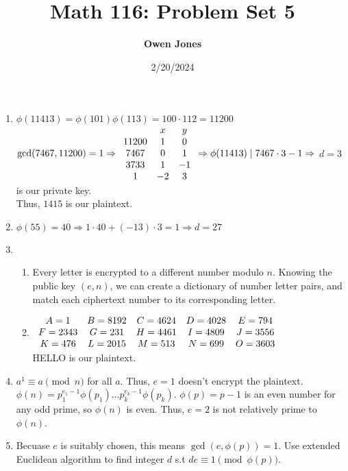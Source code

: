 \documentclass[10pt]{article}
\title{\bf Math 116: Problem Set 5}
\date{2/20/2024}
\author{\bf Owen Jones}
\begin{document}
\maketitle
\begin{enumerate}[label= \arabic*.]
    \item $\phi(11413)=\phi(101)\phi(113)=100\cdot 112=11200$ $\gcd(7467,11200)=1\Rightarrow\\
    \begin{array}{c c c}
        & x & y\\
        11200 & 1 & 0\\
        7467 & 0 & 1\\
        3733 & 1 & -1\\
        1 & -2 & 3
    \end{array}\\
    \Rightarrow \phi(11413)\mid 7467\cdot 3-1\\
    \Rightarrow$ $d=3$ is our private key.\\
    Thus, $1415$ is our plaintext.
    \item $\phi(55)=40\Rightarrow 1\cdot 40+(-13)\cdot 3=1\Rightarrow d=27$\\
    \item \begin{enumerate}
        \item Every letter is encrypted to a different number modulo $n$. Knowing the public key $(e,n)$, we can create a dictionary of number letter pairs, and match each ciphertext number to its corresponding letter.
        \item $\begin{array}{c c c c c}
            A=1 & B=8192 & C=4624 & D=4028 & E=794\\
            F=2343 & G=231 & H=4461 & I=4809 & J=3556\\ 
            K=476 & L=2015 & M=513 & N=699 & O=3603
        \end{array}$\\
        HELLO is our plaintext.
    \end{enumerate}
    \item $a^1\equiv a\pmod{n}$ for all $a$. Thus, $e=1$ doesn't encrypt the plaintext. 
    $\phi(n)=p_1^{e_1-1}\phi(p_1)\ldots p_k^{e_k-1}\phi(p_k)$. 
    $\phi(p)=p-1$ is an even number for any odd prime, so $\phi(n)$ is even. 
    Thus, $e=2$ is not relatively prime to $\phi(n)$.
    \item Becuase $e$ is suitably chosen, this means $\gcd(e,\phi(p))=1$. 
    Use extended Euclidean algorithm to find integer $d$ s.t $de\equiv 1\pmod{\phi(p)}$. 

\end{enumerate}
\end{document}
